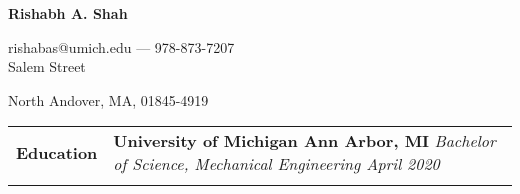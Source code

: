 \documentclass[12pt]{article}
\begin{document}

\begin{center}
{\large\noindent\textbf{Rishabh A. Shah}}

\noindent rishabas@umich.edu --- 978-873-7207 \\

 Salem Street

\noindent North Andover, MA, 01845-4919 \\
\end{center}

\begin{table}[H]
	\centering
	\begin{tabularx}{\textwidth}{@{}X p{6.25in} @{}}
		\textbf{Education} & \textbf{University of Michigan \hfill Ann Arbor, MI} \newline \textit{
		Bachelor of Science, Mechanical Engineering \hfill April 2020}
		\\
		 & \\


\end{tabularx}
\end{table}
\end{document}
